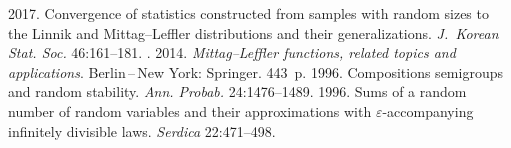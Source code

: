 \begin{multicols}{2}
{{\begin{thebibliography}{99}
 2017. 
Convergence of statistics constructed from samples with random sizes to the Linnik 
and Mittag--Leffler distributions and their generalizations. 
\textit{J.~Korean Stat. Soc.} 46:161--181.
. 2014.
\textit{Mittag--Leffler functions, related topics and applications}. 
Berlin\,--\,New York: Springer. 443~p.
 1996. Compositions semigroups and random stability. 
\textit{Ann. Probab.} 24:1476--1489.
 1996. 
Sums of a random number of random variables and their approximations with 
$\varepsilon$-accompanying infinitely divisible laws. \textit{Serdica} 22:471--498.




\end{thebibliography}}}
\end{multicols}
